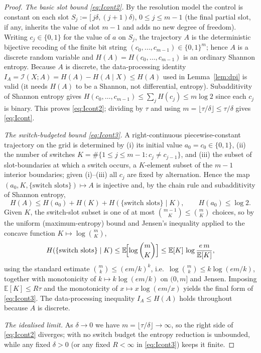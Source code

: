 \documentclass{amsart}
\theoremstyle{definition}
\newcommand{\E}{\mathbb{E}}
\begin{document}
\begin{proof}
\emph{The basic slot bound \eqref{eq:Icont2}.} By the resolution model the
control is constant on each slot $S_j:=[\,j\delta,(j+1)\delta)$, $0\le j\le m-1$
(the final partial slot, if any, inherits the value of slot $m-1$ and adds no
new degree of freedom). Writing $c_j\in\{0,1\}$ for the value of $a$ on $S_j$,
the trajectory $A$ is the deterministic bijective recoding of the finite bit
string $(c_0,\dots,c_{m-1})\in\{0,1\}^m$; hence $A$ is a discrete random
variable and $H(A)=H(c_0,\dots,c_{m-1})$ is an ordinary Shannon entropy.
Because $A$ is discrete, the data-processing identity
$I_A=\mathcal I(X;A)=H(A)-H(A\mid X)\le H(A)$ used in
Lemma~\ref{lem:dpi} is valid (it needs $H(A)$ to be a Shannon, not differential,
entropy). Subadditivity of Shannon entropy gives
$H(c_0,\dots,c_{m-1})\le\sum_{j}H(c_j)\le m\log2$ since each $c_j$ is binary.
This proves \eqref{eq:Icont2}; dividing by $\tau$ and using
$m=\lfloor\tau/\delta\rfloor\le\tau/\delta$ gives \eqref{eq:Icont}.

\emph{The switch-budgeted bound \eqref{eq:Icont3}.} A right-continuous
piecewise-constant trajectory on the grid is determined by (i) its initial value
$a_0=c_0\in\{0,1\}$, (ii) the number of switches
$K=\#\{1\le j\le m-1: c_j\ne c_{j-1}\}$, and (iii) the subset of slot-boundaries
at which a switch occurs, a $K$-element subset of the $m-1$ interior boundaries;
given (i)--(iii) all $c_j$ are fixed by alternation. Hence the map
$(a_0,K,\{\text{switch slots}\})\mapsto A$ is injective and, by the chain rule
and subadditivity of Shannon entropy,
\[
H(A)\le H(a_0)+H(K)+H(\{\text{switch slots}\}\mid K),\qquad H(a_0)\le\log2.
\]
Given $K$, the switch-slot subset is one of at most $\binom{m-1}{K}\le\binom{m}{K}$
choices, so by the uniform (maximum-entropy) bound and Jensen's inequality
applied to the concave function $K\mapsto\log\binom{m}{K}$,
\[
H(\{\text{switch slots}\}\mid K)\le \E\!\Bigl[\log\binom{m}{K}\Bigr]
\le \E[K]\,\log\frac{e\,m}{\E[K]},
\]
using the standard estimate $\binom{m}{k}\le (em/k)^{k}$, i.e.\
$\log\binom{m}{k}\le k\log(em/k)$, together with monotonicity of
$k\mapsto k\log(em/k)$ on $(0,m]$ and Jensen. Imposing $\E[K]\le R\tau$ and the
monotonicity of $x\mapsto x\log(em/x)$ yields the final form of
\eqref{eq:Icont3}. The data-processing inequality $I_A\le H(A)$ holds throughout
because $A$ is discrete.

\emph{The idealised limit.} As $\delta\to0$ we have $m=\lfloor\tau/\delta\rfloor
\to\infty$, so the right side of \eqref{eq:Icont2} diverges; with no switch
budget the entropy reduction is unbounded, while any fixed $\delta>0$ (or any
fixed $R<\infty$ in \eqref{eq:Icont3}) keeps it finite.
\end{proof}
\end{document}
